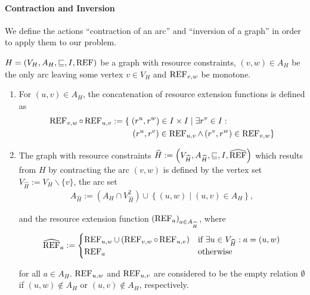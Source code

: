 \paragraph{Contraction and Inversion} \parfill

We define the actions \enquote{contraction of an arc} and \enquote{inversion of a graph} in order to apply them to our problem.

\begin{definition}[Contraction]

${H=\left(V_H,A_H,\sqsubseteq,I,\operatorname{REF}\right)}$ be a graph with resource constraints, ${(v,w)\in A_H}$ be the only arc leaving some vertex $v\in V_H$ and $\operatorname{REF}_{v,w}$ be monotone.
\begin{enumerate}
	\item
For $(u,v)\in A_H$, the concatenation of resource extension functions is defined as
\begin{align*}
	\REF_{v,w}\circ\REF_{u,v} := \left\{\vphantom{\REF_{v,w}}\right. & \left(r^u,r^w\right)\in I\times I\mid \exists r^v\in I: \\
	& \left.\left(r^u,r^v\right)\in\REF_{u,v}\land\left(r^v,r^w\right)\in\REF_{v,w}\right\}
\end{align*}
	\item
The graph with resource constraints ${\widehat{H} := \left(V_{\widehat{H}},A_{\widehat{H}},\sqsubseteq,I,\widehat{\operatorname{REF}}\right)}$ which results from $H$ by contracting the arc $(v,w)$ is defined by the vertex set ${V_{\widehat{H}} := V_H\backslash\{v\}}$, the arc set
\begin{align*}
	A_{\widehat{H}} := \left(A_H\cap V^2_{\widehat{H}}\right) \cup \left\{(u,w)\mid (u,v)\in A_H\right\},
\end{align*}

and the resource extension function ${\left(\operatorname{REF}_a\right)_{a\in A_{\widehat{H}}}}$, where
\begin{align*}
	\widehat{\operatorname{REF}}_a :=
	\begin{cases}
		\operatorname{REF}_{u,w}\cup\left(\operatorname{REF}_{v,w}\circ\operatorname{REF}_{u,v}\right) & \text{if } \exists u\in V_{\widehat{H}}: a=(u,w) \\
		\operatorname{REF}_a & \text{otherwise}
	\end{cases}
\end{align*}

for all ${a\in A_H}$. $\operatorname{REF}_{u,w}$ and $\operatorname{REF}_{u,v}$ are considered to be the empty relation $\emptyset$ if ${(u,w)\not\in A_H}$ or ${(u,v)\not\in A_H}$, respectively.

\end{enumerate}

\end{definition}


